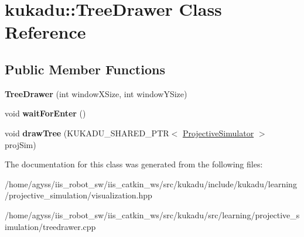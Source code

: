 \hypertarget{classkukadu_1_1TreeDrawer}{}\section{kukadu\+:\+:Tree\+Drawer Class Reference}
\label{classkukadu_1_1TreeDrawer}
\subsection*{Public Member Functions}
\begin{DoxyCompactItemize}
\item 
{\bfseries Tree\+Drawer} (int window\+X\+Size, int window\+Y\+Size)\hypertarget{classkukadu_1_1TreeDrawer_acf3cd4e75efee11b5bd5cbfc0abf2274}{}\label{classkukadu_1_1TreeDrawer_acf3cd4e75efee11b5bd5cbfc0abf2274}

\item 
void {\bfseries wait\+For\+Enter} ()\hypertarget{classkukadu_1_1TreeDrawer_afe6018b1e9acfe71d36db95614c0860b}{}\label{classkukadu_1_1TreeDrawer_afe6018b1e9acfe71d36db95614c0860b}

\item 
void {\bfseries draw\+Tree} (K\+U\+K\+A\+D\+U\+\_\+\+S\+H\+A\+R\+E\+D\+\_\+\+P\+TR$<$ \hyperlink{classkukadu_1_1ProjectiveSimulator}{Projective\+Simulator} $>$ proj\+Sim)\hypertarget{classkukadu_1_1TreeDrawer_a7b12348305dac91bcde4da27d0d2fa8c}{}\label{classkukadu_1_1TreeDrawer_a7b12348305dac91bcde4da27d0d2fa8c}

\end{DoxyCompactItemize}


The documentation for this class was generated from the following files\+:\begin{DoxyCompactItemize}
\item 
/home/agyss/iis\+\_\+robot\+\_\+sw/iis\+\_\+catkin\+\_\+ws/src/kukadu/include/kukadu/learning/projective\+\_\+simulation/visualization.\+hpp\item 
/home/agyss/iis\+\_\+robot\+\_\+sw/iis\+\_\+catkin\+\_\+ws/src/kukadu/src/learning/projective\+\_\+simulation/treedrawer.\+cpp\end{DoxyCompactItemize}
